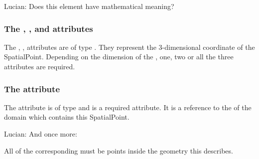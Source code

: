 {\color{red} Lucian: \notice Does this element have mathematical meaning?}

\subsubsection{The , , and  attributes}
The , ,  attributes are of type . They represent the 3-dimensional coordinate of the SpatialPoint. Depending on the dimension of the \Geometry, one, two or all the three attributes are required. 

\subsubsection{The  attribute}
The  attribute is of type  and is a required attribute. It is a reference to the  of the domain which contains this SpatialPoint.

{\color{red} Lucian: \notice And once more:}

All \InteriorPoints of the corresponding \Domain must be points inside the geometry this \SpatialPoint describes.

